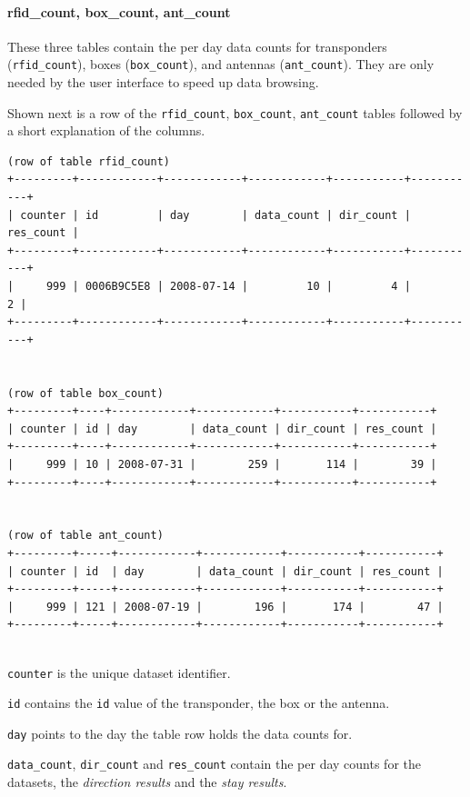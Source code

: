 \paragraph{rfid\_count, box\_count, ant\_count}
\label{para:counts}

These three tables contain the per day data counts for transponders (\lstinline|rfid_count|), boxes (\lstinline|box_count|), and antennas (\lstinline|ant_count|). They are only needed by the user interface to speed up data browsing.

Shown next is a row of the \lstinline|rfid_count|, \lstinline|box_count|, \lstinline|ant_count| tables followed by a short explanation of the columns.

\codescript
{}
\begin{lstlisting}[frame=none]
(row of table rfid_count)
+---------+------------+------------+------------+-----------+-----------+
| counter | id         | day        | data_count | dir_count | res_count |
+---------+------------+------------+------------+-----------+-----------+
|     999 | 0006B9C5E8 | 2008-07-14 |         10 |         4 |         2 | 
+---------+------------+------------+------------+-----------+-----------+


(row of table box_count)
+---------+----+------------+------------+-----------+-----------+
| counter | id | day        | data_count | dir_count | res_count |
+---------+----+------------+------------+-----------+-----------+
|     999 | 10 | 2008-07-31 |        259 |       114 |        39 | 
+---------+----+------------+------------+-----------+-----------+


(row of table ant_count)
+---------+-----+------------+------------+-----------+-----------+
| counter | id  | day        | data_count | dir_count | res_count |
+---------+-----+------------+------------+-----------+-----------+
|     999 | 121 | 2008-07-19 |        196 |       174 |        47 | 
+---------+-----+------------+------------+-----------+-----------+


\end{lstlisting}

\begin{mydesc}
\item \lstinline|counter| is the unique dataset identifier.
\item \lstinline|id| contains the \lstinline|id| value of the transponder, the box or the antenna.
\item \lstinline|day| points to the day the table row holds the data counts for.
\item \lstinline|data_count|, \lstinline|dir_count| and \lstinline|res_count| contain the per day counts for the datasets, the \textit{direction results} and the \textit{stay results}.
\end{mydesc}

